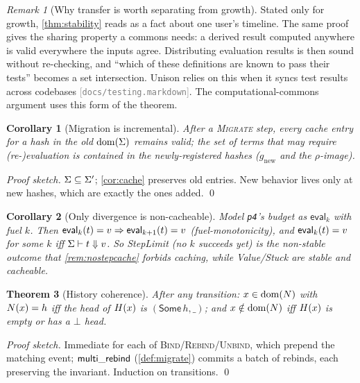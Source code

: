 \documentclass[11pt]{article}
\theoremstyle{definition}
\theoremstyle{plain}
\newtheorem{theorem}{Theorem}[section]
\newtheorem{corollary}[theorem]{Corollary}
\theoremstyle{remark}
\newtheorem{remark}{Remark}[section]
\newcommand{\src}[1]{{\footnotesize\textcolor{gray}{[\texttt{#1}]}}}
\begin{document}
\begin{remark}[Why transfer is worth separating from growth]\label{rem:transfer}
Stated only for growth, \cref{thm:stability} reads as a fact about one user's timeline. The same
proof gives the sharing property a commons needs: a derived result computed anywhere is valid
everywhere the inputs agree. Distributing evaluation results is then sound without
re-checking, and ``which of these definitions are known to pass their tests'' becomes a set
intersection. Unison relies on this when it syncs test results across codebases
\src{docs/testing.markdown}. The computational-commons argument uses this form of the theorem.
\end{remark}

\begin{corollary}[Migration is incremental]\label{cor:incremental}
After a \textsc{Migrate} step, every cache entry for a hash in the \emph{old} $\operatorname{dom}(\Sigma)$
remains valid; the set of terms that may require (re-)evaluation is contained in the
newly-registered hashes ($g_{\mathrm{new}}$ and the $\rho$-image).
\end{corollary}
\begin{proof}[Proof sketch]
$\Sigma \subseteq \Sigma'$; \cref{cor:cache} preserves old entries. New behavior lives only at
new hashes, which are exactly the ones added. \qed
\end{proof}

\begin{corollary}[Only divergence is non-cacheable]\label{cor:fuel}
Model \texttt{p4}'s budget as $\mathsf{eval}_k$ with fuel $k$. Then $\mathsf{eval}_k(t)=v
\Rightarrow \mathsf{eval}_{k+1}(t)=v$ (fuel-monotonicity), and $\mathsf{eval}_k(t)=v$ for
some $k$ iff $\Sigma \vdash t \Downarrow v$. So \textsf{StepLimit} (no $k$ succeeds yet) is the
non-stable outcome that \cref{rem:nostepcache} forbids caching, while
\textsf{Value}/\textsf{Stuck} are stable and cacheable.
\end{corollary}

\begin{theorem}[History coherence]\label{thm:histcoh}
After any transition: $x \in \operatorname{dom}(N)$ with $N(x)=h$ iff the head of $H(x)$ is
$(\mathsf{Some}\,h,\_)$; and $x \notin \operatorname{dom}(N)$ iff $H(x)$ is empty or has a $\bot$
head.
\end{theorem}
\begin{proof}[Proof sketch]
Immediate for each of \textsc{Bind}/\textsc{Rebind}/\textsc{Unbind}, which prepend the matching
event; $\mathsf{multi\_rebind}$ (\cref{def:migrate}) commits a batch of rebinds, each preserving the
invariant. Induction on transitions. \qed
\end{proof}
\end{document}
